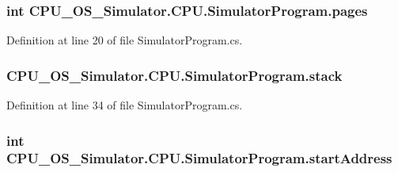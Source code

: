 \subsubsection[{pages}]{\setlength{\rightskip}{0pt plus 5cm}int C\+P\+U\+\_\+\+O\+S\+\_\+\+Simulator.\+C\+P\+U.\+Simulator\+Program.\+pages\hspace{0.3cm}{\ttfamily [private]}}\label{class_c_p_u___o_s___simulator_1_1_c_p_u_1_1_simulator_program_ad86f4c2caa37cf36b8ab276ebe2a39bb}


Definition at line 20 of file Simulator\+Program.\+cs.

\hypertarget{class_c_p_u___o_s___simulator_1_1_c_p_u_1_1_simulator_program_a85f44af349486db4b141b3946bf21a64}{}
\subsubsection[{stack}]{ C\+P\+U\+\_\+\+O\+S\+\_\+\+Simulator.\+C\+P\+U.\+Simulator\+Program.\+stack\hspace{0.3cm}{\ttfamily [private]}}\label{class_c_p_u___o_s___simulator_1_1_c_p_u_1_1_simulator_program_a85f44af349486db4b141b3946bf21a64}


Definition at line 34 of file Simulator\+Program.\+cs.

\hypertarget{class_c_p_u___o_s___simulator_1_1_c_p_u_1_1_simulator_program_a4c9c4638141ac68fc7f2fed83c53d3f5}{}
\subsubsection[{start\+Address}]{\setlength{\rightskip}{0pt plus 5cm}int C\+P\+U\+\_\+\+O\+S\+\_\+\+Simulator.\+C\+P\+U.\+Simulator\+Program.\+start\+Address\hspace{0.3cm}{\ttfamily [private]}}\label{class_c_p_u___o_s___simulator_1_1_c_p_u_1_1_simulator_program_a4c9c4638141ac68fc7f2fed83c53d3f5}



